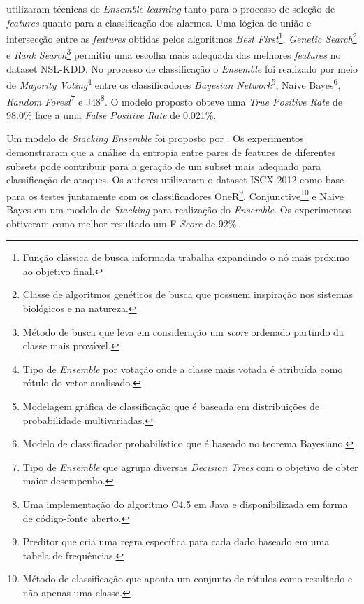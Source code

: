  utilizaram técnicas de \textit{Ensemble learning} tanto para o processo de seleção de \textit{features} quanto para a classificação dos alarmes. Uma lógica de união e intersecção entre as \textit{features} obtidas pelos algoritmos \textit{Best First}\footnote{Função clássica de busca informada trabalha expandindo o nó mais próximo ao objetivo final.}, \textit{Genetic Search}\footnote{Classe de algoritmos genéticos de busca que possuem inspiração nos sistemas biológicos e na natureza.} e \textit{Rank Search}\footnote{Método de busca que leva em consideração um \textit{score} ordenado partindo da classe mais provável.} permitiu uma escolha mais adequada das melhores \textit{features} no dataset NSL-KDD. No processo de classificação o \textit{Ensemble} foi realizado por meio de \textit{Majority Voting}\footnote{Tipo de \textit{Ensemble} por votação onde a classe mais votada é atribuída como rótulo do vetor analisado.} entre os classificadores \textit{Bayesian Network}\footnote{Modelagem gráfica de classificação que é baseada em distribuições de probabilidade multivariadas.}, Naive Bayes\footnote{Modelo de classificador probabilístico que é baseado no teorema Bayesiano.}, \textit{Random Forest}\footnote{Tipo de \textit{Ensemble} que agrupa diversas \textit{Decision Trees} com o objetivo de obter maior desempenho.} e J48\footnote{Uma implementação do algoritmo C4.5 em Java e disponibilizada em forma de código-fonte aberto.}. O modelo proposto obteve uma \textit{True Positive Rate} de 98.0\%  face a uma \textit{False Positive Rate} de 0.021\%. 

Um modelo de \textit{Stacking Ensemble} foi proposto por . Os experimentos demonstraram que a análise da entropia entre pares de features de diferentes subsets pode contribuir para a geração de um subset mais adequado para classificação de ataques. Os autores utilizaram o dataset ISCX 2012 como base para os testes juntamente com os classificadores OneR\footnote{Preditor que cria uma regra específica para cada dado baseado em uma tabela de frequências.}, Conjunctive\footnote{Método de classificação que aponta um conjunto de rótulos como resultado e não apenas uma classe.} e Naive Bayes em um modelo de \textit{Stacking} para realização do \textit{Ensemble}. Os experimentos obtiveram como melhor resultado um F-\textit{Score} de 92\%.

